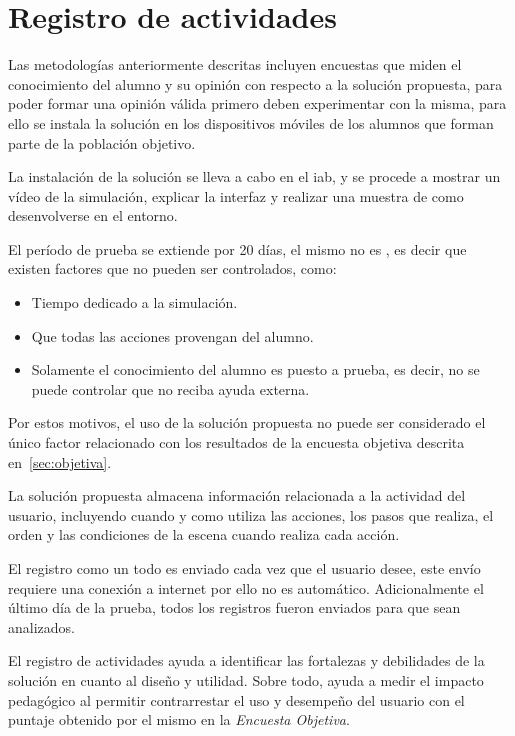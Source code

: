 \section{Registro de actividades}
\label{sec:registro}

Las metodologías anteriormente descritas incluyen encuestas que miden
el conocimiento del alumno y su opinión con respecto a la solución propuesta,
para poder formar una opinión válida primero deben experimentar con la misma, para
ello se instala la solución en los dispositivos móviles de los alumnos que forman 
parte de la población objetivo.

La instalación de la solución se lleva a cabo en el \Gls{iab}, y se procede 
a mostrar un vídeo de la simulación, explicar la interfaz y realizar una muestra 
de como desenvolverse en el entorno.

El período de prueba se extiende por 20 días, el mismo no es
, es decir que existen factores que no pueden ser
controlados, como:

\begin{itemize}
    \item Tiempo dedicado a la simulación.
    \item Que todas las acciones provengan del alumno.
    \item Solamente el conocimiento del alumno es puesto a prueba, es decir, no
        se puede controlar que no reciba ayuda externa.
\end{itemize}

Por estos motivos, el uso de la solución propuesta no puede ser considerado
el único factor relacionado con los resultados de la encuesta objetiva
descrita en~\ref{sec:objetiva}.

La solución propuesta almacena información relacionada a la actividad del
usuario, incluyendo cuando y como utiliza las acciones, los pasos que realiza,
el orden y las condiciones de la escena cuando realiza cada acción.

El registro como un todo es enviado cada vez que el usuario desee, este envío
requiere una conexión a internet por ello no es automático. Adicionalmente el
último día de la prueba, todos los registros fueron enviados para que sean
analizados.

El registro de actividades ayuda a identificar las  fortalezas y debilidades 
de la solución en cuanto al diseño y utilidad. Sobre todo, ayuda a medir 
el impacto pedagógico al permitir contrarrestar el uso y desempeño del usuario 
con el puntaje obtenido por el mismo en la \emph{Encuesta Objetiva}.

